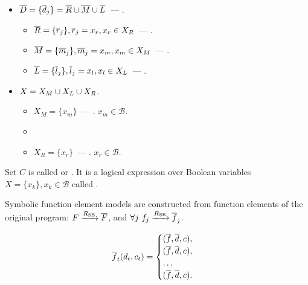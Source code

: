 \begin{itemize}
    \item $\overline{D} = \{\overline{d}_j\} = \overline{R} \cup \textcolor{black}{\overline{M}} \cup \overline{L}$~---
        .
        \begin{itemize}
            \item $\overline{R} = \{\overline{r}_j\}, \overline{r}_j = x_r, x_r \in X_R$~---
                .
            \item $\overline{M} = \{\overline{m}_j\}, \overline{m}_j = x_m, x_m \in X_M$~---
                .
            \item $\overline{L} = \{\overline{l}_j\}, \overline{l}_j = x_l, x_l \in X_L$~---
                .
        \end{itemize}
    \item $X = X_M \cup \textcolor{black}{X_L} \cup X_R$.
        \begin{itemize}
            \item $X_M = \{x_m\}$~---
                . $x_m \in \mathcal{B}$.
            \item {}
            \item $X_R = \{x_r\}$~---
                . $x_r \in \mathcal{B}$.
        \end{itemize}
\end{itemize}



Set $C$ is called  or .
It is a logical expression over Boolean variables
$X = \{x_k\}, x_k \in \mathcal{B}$ called
.


Symbolic function element models are constructed from function elements of the
original program:
$F \xrightarrow[]{R_\text{SE}} \overline{F}$, and
$\forall j \,\, f_j \xrightarrow[]{R_\text{SE}} \overline{f}_j$.

\begin{align}
\overline{f}_t(d_t, c_t) =
    \begin{cases}
        (\overline{f}, \overline{d}, c), \\
        (\overline{f}, \overline{d}, c), \\
        \dots \\
        (\overline{f}, \overline{d}, c).
    \end{cases}
\end{align}

